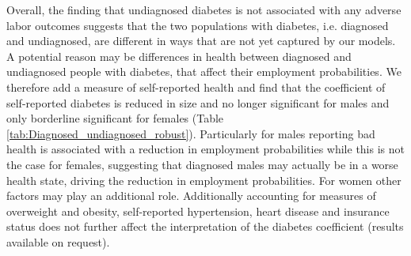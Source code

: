 \documentclass[12pt,english,british]{article}
\begin{document}

Overall, the finding that undiagnosed diabetes is not associated with any adverse labor outcomes suggests that the two populations with diabetes, i.e. diagnosed and undiagnosed, are different in ways that are not yet captured by our models. A potential reason may be differences in health between diagnosed and undiagnosed people with diabetes, that affect their employment probabilities. We therefore  add a measure of self-reported health and find that the coefficient of self-reported diabetes is reduced in size and no longer significant for males and only borderline significant for females (Table \ref{tab:Diagnosed_undiagnosed_robust}). Particularly for males reporting bad health is associated with a reduction in employment probabilities while this is not the case for females, suggesting that diagnosed males may actually be in a worse health state, driving the reduction in employment probabilities. For women other factors may play an additional role. Additionally accounting for measures of overweight and obesity, self-reported hypertension, heart disease and insurance status does not further affect the interpretation of the diabetes coefficient (results available on request).
\end{document}
